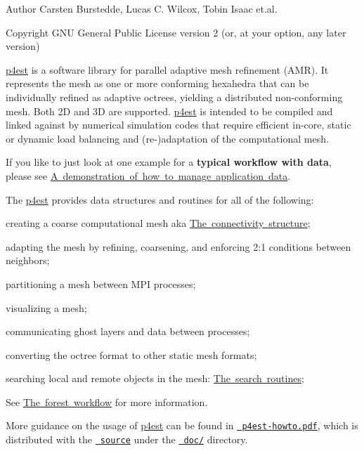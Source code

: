 \begin{DoxyAuthor}{Author}
Carsten Burstedde, Lucas C. Wilcox, Tobin Isaac et.\+al. 
\end{DoxyAuthor}
\begin{DoxyCopyright}{Copyright}
GNU General Public License version 2 (or, at your option, any later version)
\end{DoxyCopyright}
\mbox{\hyperlink{structp4est}{p4est}} is a software library for parallel adaptive mesh refinement (AMR). It represents the mesh as one or more conforming hexahedra that can be individually refined as adaptive octrees, yielding a distributed non-\/conforming mesh. Both 2D and 3D are supported. \mbox{\hyperlink{structp4est}{p4est}} is intended to be compiled and linked against by numerical simulation codes that require efficient in-\/core, static or dynamic load balancing and (re-\/)adaptation of the computational mesh.

If you like to just look at one example for a {\bfseries{typical workflow with data}}, please see \mbox{\hyperlink{example_userdata}{A demonstration of how to manage application data}}.

The \mbox{\hyperlink{structp4est}{p4est}} provides data structures and routines for all of the following\+:


\begin{DoxyItemize}
\item creating a coarse computational mesh aka \mbox{\hyperlink{connectivity}{The connectivity structure}};
\item adapting the mesh by refining, coarsening, and enforcing 2\+:1 conditions between neighbors;
\item partitioning a mesh between MPI processes;
\item visualizing a mesh;
\item communicating ghost layers and data between processes;
\item converting the octree format to other static mesh formats;
\item searching local and remote objects in the mesh\+: \mbox{\hyperlink{search}{The search routines}};
\item See \mbox{\hyperlink{forest}{The forest workflow}} for more information.
\end{DoxyItemize}

More guidance on the usage of \mbox{\hyperlink{structp4est}{p4est}} can be found in \href{http://p4est.github.io/p4est-howto.pdf}{\texttt{ p4est-\/howto.\+pdf}}, which is distributed with the \href{http://github.com/cburstedde/p4est}{\texttt{ source}} under the \href{https://github.com/cburstedde/p4est/tree/master/doc}{\texttt{ doc/}} directory.

